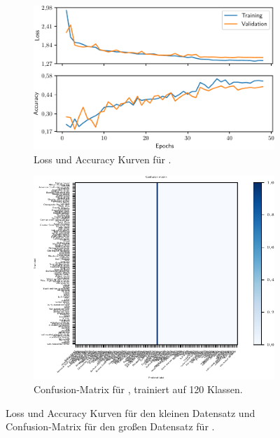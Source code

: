 \begin{figure}
  \begin{subfigure}{0.49\textwidth}
    \centering
    \includegraphics[width=\textwidth]{pics/ergebnisse/MiniDogNN/history.pdf}
    \caption{Loss und Accuracy Kurven für \MiniDog{}.}
    \label{fig:loss-acc-minidog}
  \end{subfigure}
  \qquad
  \begin{subfigure}{0.49\textwidth}
    \centering
    \includegraphics[width=\textwidth]{pics/ergebnisse/MiniDogNN/confusion_matrix_mini120.pdf}
    \caption{Confusion-Matrix für \MiniDog{}, trainiert auf 120 Klassen.}
    \label{fig:confusion-mini-120}
  \end{subfigure}
  \caption{Loss und Accuracy Kurven für den kleinen Datensatz und Confusion-Matrix
  für den großen Datensatz für \MiniDog{}.}
  \label{fig:mischmasch-minidog}
\end{figure}

